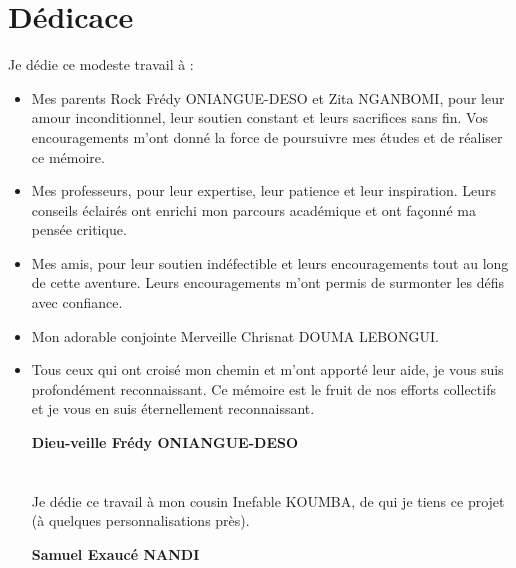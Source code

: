 \chapter*{Dédicace}
Je dédie ce modeste travail à :

\begin{itemize}
  \item {
      Mes parents Rock Frédy ONIANGUE-DESO et Zita NGANBOMI, pour leur amour
      inconditionnel, leur soutien constant et leurs sacrifices sans fin. Vos
      encouragements m’ont donné la force de poursuivre mes études et de réaliser ce mémoire.
    }
  \item {
      Mes professeurs, pour leur expertise, leur patience et leur inspiration.
      Leurs conseils éclairés ont enrichi mon parcours académique et ont façonné ma pensée critique.

    }
  \item {
      Mes amis, pour leur soutien indéfectible et leurs encouragements tout au
      long de cette aventure. Leurs encouragements m’ont permis de surmonter les défis avec confiance.

    }

  \item {
      Mon adorable conjointe Merveille Chrisnat DOUMA LEBONGUI.

    }

  \item {
      Tous ceux qui ont croisé mon chemin et m’ont apporté leur aide,
      je vous suis profondément reconnaissant. Ce mémoire est le fruit de nos
      efforts collectifs et je vous en suis éternellement reconnaissant.
    }

    \vspace{0.2cm}
    \begin{flushright}
      \large {
        \textbf {
          Dieu-veille Frédy ONIANGUE-DESO
        }
      }
    \end{flushright}


    \newpage
\chapter*{}

    \vspace{2cm}
    Je dédie ce travail à mon cousin  Inefable KOUMBA, de qui je tiens ce projet (à quelques personnalisations près).
    \vspace{0.2cm}
    \begin{flushright}
      \large {
        \textbf {
          Samuel Exaucé NANDI
        }
      }
    \end{flushright}

\end{itemize}
